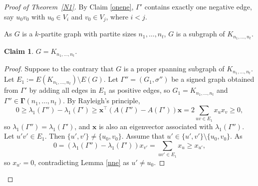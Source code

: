 \documentclass[10pt,a4paper]{amsart}
\numberwithin{equation}{section}
\newtheorem {Claim} {Claim}[section]
\begin{document}
\begin{proof}[Proof of Theorem~\ref{N1}]
 By Claim \ref{onene}, $\Gamma'$ contains exactly one negative edge, say  $u_0v_0$ with $u_0\in V_i$ and $v_0\in V_j$, where $i<j$.

As $G$ is a $k$-partite graph with partite sizes $n_1,\dots, n_t$, $G$ is a subgraph of $K_{n_1,\dots, n_t}$. 

\begin{Claim}\label{complete}
$G= K_{n_1, \dots, n_t}$.
\end{Claim}

\begin{proof}
Suppose to the contrary that $G$ is a proper spanning subgraph of $K_{n_1, \dots, n_t}$. 
Let  $E_1:=E(K_{n_1, \dots, n_t})\setminus E(G)$. 
Let $\Gamma''=(G_1,\sigma'')$ be a signed graph obtained from $\Gamma'$ by adding all  edges in $E_1$ as positive edges, so $G_1=K_{n_1, \dots, n_t}$ and  $\Gamma''\in \boldsymbol\Gamma (n_1,\dots, n_t)$. 
By Rayleigh's principle, 
\[
0\ge \lambda_1(\Gamma'')-\lambda_1(\Gamma')\ge \mathbf{x}^\top \left(A(\Gamma'')-A(\Gamma')\right)\mathbf{x}=2\sum_{uv\in E_1}x_ux_v\ge0, 
\]
so $\lambda_1(\Gamma'')=\lambda_1(\Gamma')$, and $\mathbf{x}$ is also an eigenvector associated with $\lambda_1(\Gamma'')$. 
Let $u'v'\in E_1$. 
Then  $\{u', v'\}\ne \{u_0, v_0\}$. Assume that $u'\in \{u', v'\}\setminus \{u_0, v_0\}$. 
As 
\[
0=\left(\lambda_1(\Gamma'')-\lambda_1(\Gamma')\right)x_{v'}=\sum_{uv'\in E_1}x_u\ge x_{u'}, 
\]
so $x_{u'}=0$, contradicting  Lemma \ref{nne} as $u'\ne u_0$. %
\end{proof}






\end{proof}
\end{document}
